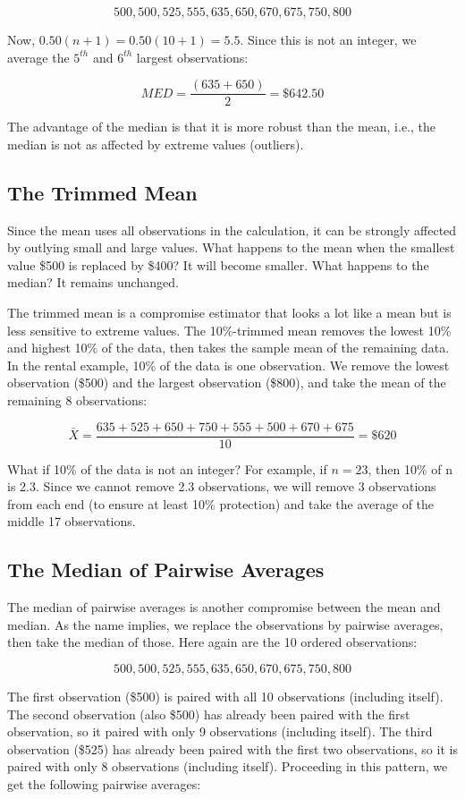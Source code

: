 \documentclass[11pt, chapterprefix=true]{scrbook}\usepackage[]{graphicx}\usepackage[]{color}
\begin{document}
$$ 500, 500, 525, 555, 635, 650, 670, 675, 750, 800 $$

Now, $0.50(n + 1) = 0.50(10 + 1) = 5.5$.  Since this is not an integer, we average the $5^{th}$ and $6^{th}$ largest observations:

$$MED = \frac{(635 + 650)}{2} = \$642.50$$

The advantage of the median is that it is more robust than the mean, i.e., the median is not as affected by extreme values (outliers).

\subsection{The Trimmed Mean}

Since the mean uses all observations in the calculation, it can be strongly affected by outlying small and large values.  What happens to the mean when the smallest value \$500 is replaced by \$400?  It will become smaller.  What happens to the median?  It remains unchanged.

The trimmed mean is a compromise estimator that looks a lot like a mean but is less sensitive to extreme values.  The 10\%-trimmed mean removes the lowest 10\% and highest 10\% of the data, then takes the sample mean of the remaining data.  In the rental example, 10\% of the data is one observation. We remove the lowest
observation (\$500) and the largest observation (\$800), and take the mean of the remaining 8 observations:

$$\bar{X} = \frac{635+525+650+750+555+500+670+675}{10} = \$620$$

What if 10\% of the data is not an integer?  For example, if $n = 23$, then 10\% of n is 2.3.  Since we cannot remove 2.3 observations, we will remove 3 observations from each end (to ensure at least 10\% protection) and take the average of the middle 17 observations.

\subsection{The Median of Pairwise Averages}

The median of pairwise averages is another compromise between the mean and median.  As the name implies, we replace the observations by pairwise averages, then take the median of those.  Here again are the 10 ordered observations:

$$ 500, 500, 525, 555, 635, 650, 670, 675, 750, 800 $$

The first observation (\$500) is paired with all 10 observations (including itself).  The second observation (also \$500) has already been paired with the first observation, so it paired with only 9 observations (including itself).  The third observation (\$525) has already been paired with the first two observations, so it is paired with only 8 observations (including itself).  Proceeding in this pattern, we get the following pairwise averages:
\end{document}
